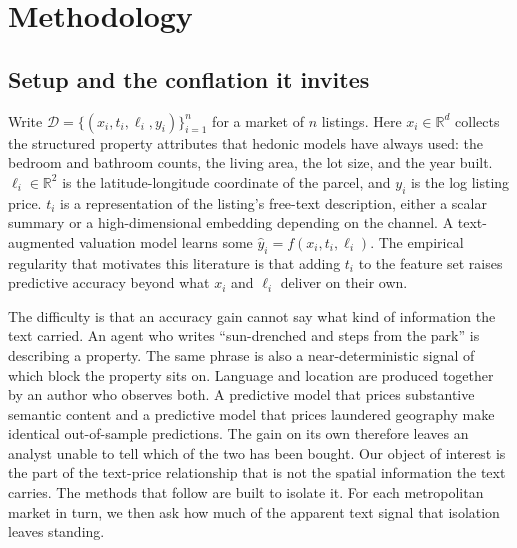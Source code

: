 
\section{Methodology}
\label{sec:methods}

\subsection{Setup and the conflation it invites}

Write $\mathcal{D} = \{(x_i, t_i, \ell_i, y_i)\}_{i=1}^{n}$ for a market of $n$
listings. Here $x_i \in \mathbb{R}^{d}$ collects the structured property
attributes that hedonic models have always used: the bedroom and bathroom counts,
the living area, the lot size, and the year built. $\ell_i \in \mathbb{R}^{2}$ is
the latitude-longitude coordinate of the parcel, and $y_i$ is the log listing price.
$t_i$ is a representation of the listing's free-text description, either a scalar
summary or a high-dimensional embedding depending on the channel. A text-augmented
valuation model learns some $\hat{y}_i = f(x_i, t_i, \ell_i)$. The empirical
regularity that motivates this literature is that adding $t_i$ to the feature set
raises predictive accuracy beyond what $x_i$ and $\ell_i$ deliver on their own.

The difficulty is that an accuracy gain cannot say what kind of information the
text carried. An agent who writes ``sun-drenched and steps from the park'' is
describing a property. The same phrase is also a near-deterministic signal of
which block the property sits on. Language and location are produced
together by an author who observes both. A predictive model that prices substantive
semantic content and a predictive model that prices laundered geography make
identical out-of-sample predictions. The gain on its own therefore leaves an analyst
unable to tell which of the two has been bought. Our object of interest is the
part of the text-price relationship that is not the spatial information the text
carries. The methods that follow are built to isolate it. For each metropolitan
market in turn, we then ask how much of the apparent text signal that
isolation leaves standing.

